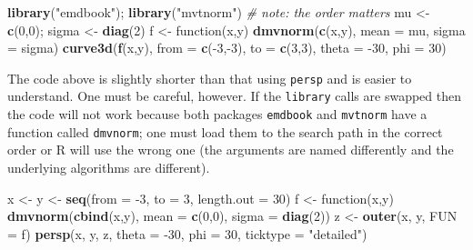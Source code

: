\documentclass[]{book}
\newenvironment{Shaded}{\begin{snugshade}}{\end{snugshade}}
\newcommand{\KeywordTok}[1]{\textcolor[rgb]{0.13,0.29,0.53}{\textbf{{#1}}}}
\newcommand{\DataTypeTok}[1]{\textcolor[rgb]{0.13,0.29,0.53}{{#1}}}
\newcommand{\DecValTok}[1]{\textcolor[rgb]{0.00,0.00,0.81}{{#1}}}
\newcommand{\StringTok}[1]{\textcolor[rgb]{0.31,0.60,0.02}{{#1}}}
\newcommand{\CommentTok}[1]{\textcolor[rgb]{0.56,0.35,0.01}{\textit{{#1}}}}
\newcommand{\NormalTok}[1]{{#1}}
\numberwithin{equation}{chapter}
\numberwithin{figure}{chapter}
\theoremstyle{plain}
\theoremstyle{definition}
\theoremstyle{remark}
\theoremstyle{definition}
\theoremstyle{definition}
\theoremstyle{remark}
\begin{document}
\begin{Shaded}
\begin{Highlighting}[]
\KeywordTok{library}\NormalTok{(}\StringTok{"emdbook"}\NormalTok{); }\KeywordTok{library}\NormalTok{(}\StringTok{"mvtnorm"}\NormalTok{) }\CommentTok{# note: the order matters}
\NormalTok{mu <-}\StringTok{ }\KeywordTok{c}\NormalTok{(}\DecValTok{0}\NormalTok{,}\DecValTok{0}\NormalTok{); sigma <-}\StringTok{ }\KeywordTok{diag}\NormalTok{(}\DecValTok{2}\NormalTok{)}
\NormalTok{f <-}\StringTok{ }\NormalTok{function(x,y) }\KeywordTok{dmvnorm}\NormalTok{(}\KeywordTok{c}\NormalTok{(x,y), }\DataTypeTok{mean =} \NormalTok{mu, }\DataTypeTok{sigma =} \NormalTok{sigma)}
\KeywordTok{curve3d}\NormalTok{(}\KeywordTok{f}\NormalTok{(x,y), }\DataTypeTok{from =} \KeywordTok{c}\NormalTok{(-}\DecValTok{3}\NormalTok{,-}\DecValTok{3}\NormalTok{), }\DataTypeTok{to =} \KeywordTok{c}\NormalTok{(}\DecValTok{3}\NormalTok{,}\DecValTok{3}\NormalTok{), }\DataTypeTok{theta =} \NormalTok{-}\DecValTok{30}\NormalTok{, }\DataTypeTok{phi =} \DecValTok{30}\NormalTok{)}
\end{Highlighting}
\end{Shaded}

The code above is slightly shorter than that using \texttt{persp} and is
easier to understand. One must be careful, however. If the
\texttt{library} calls are swapped then the code will not work because
both packages \texttt{emdbook} and \texttt{mvtnorm} have a function
called \texttt{dmvnorm}; one must load them to the search path in the
correct order or R will use the wrong one (the arguments are named
differently and the underlying algorithms are different).

\begin{Shaded}
\begin{Highlighting}[]
\NormalTok{x <-}\StringTok{ }\NormalTok{y <-}\StringTok{ }\KeywordTok{seq}\NormalTok{(}\DataTypeTok{from =} \NormalTok{-}\DecValTok{3}\NormalTok{, }\DataTypeTok{to =} \DecValTok{3}\NormalTok{, }\DataTypeTok{length.out =} \DecValTok{30}\NormalTok{)}
\NormalTok{f <-}\StringTok{ }\NormalTok{function(x,y) }\KeywordTok{dmvnorm}\NormalTok{(}\KeywordTok{cbind}\NormalTok{(x,y), }\DataTypeTok{mean =} \KeywordTok{c}\NormalTok{(}\DecValTok{0}\NormalTok{,}\DecValTok{0}\NormalTok{), }\DataTypeTok{sigma =} \KeywordTok{diag}\NormalTok{(}\DecValTok{2}\NormalTok{))}
\NormalTok{z <-}\StringTok{ }\KeywordTok{outer}\NormalTok{(x, y, }\DataTypeTok{FUN =} \NormalTok{f)}
\KeywordTok{persp}\NormalTok{(x, y, z, }\DataTypeTok{theta =} \NormalTok{-}\DecValTok{30}\NormalTok{, }\DataTypeTok{phi =} \DecValTok{30}\NormalTok{, }\DataTypeTok{ticktype =} \StringTok{"detailed"}\NormalTok{)}
\end{Highlighting}
\end{Shaded}
\end{document}
